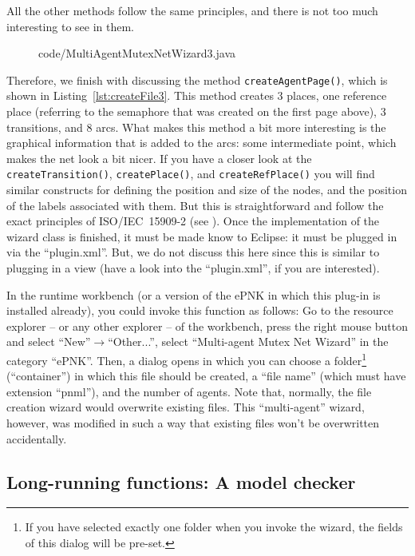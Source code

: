 All the other methods follow the same principles, and there  is
not too much interesting to see in them.
%
\begin{figure}[htbp!]
%
  {code/MultiAgentMutexNetWizard3.java}
\end{figure}
% 
Therefore, we finish with discussing the method {\tt  createAgentPage()},
which is shown in Listing~\ref{lst:createFile3}. This method
creates 3 places, one reference place (referring to the semaphore
that was created on the first page above), 3 transitions, and 8 arcs.
What makes this method a bit more interesting is the graphical
information that is added to the arcs: some intermediate point,
which makes the net look a bit nicer. If you have a closer look
at the {\tt createTransition()}, {\tt createPlace()}, and  {\tt createRefPlace()}
you will find similar constructs for defining the position and size
of the nodes, and the position of the labels associated with them.
But this is straightforward and follow the exact principles
of ISO/IEC~15909-2 (see \cite{HKea09}). Once the implementation
of the wizard class is finished, it must be made know to Eclipse: it must be
plugged in via the ``plugin.xml''. But, we do not discuss this here since
this is similar to plugging in a view (have a look
into the ``plugin.xml'', if you are interested).

In the runtime workbench (or a version of the ePNK in which this plug-in
is installed already), you could invoke this function as follows: Go to the
resource explorer -- or any other explorer -- of the workbench, press
the right mouse button and select ``New''$\rightarrow$``Other...'',
select ``Multi-agent Mutex Net Wizard'' in the category ``ePNK''. Then,
a dialog opens in which you can choose a folder\footnote
  {If you have selected exactly one folder when you invoke the
   wizard, the fields of this dialog will be pre-set.}
(``container'') in which this file should be created, a ``file name'' (which
must have extension ``pnml''), and the number of agents. Note that, normally,
the file creation wizard would overwrite existing files. This ``multi-agent''
wizard, however, was modified in such a way that existing files won't be
overwritten accidentally.%

\subsection{Long-running functions: A model checker}
\label{subsec:tutorial-MC}

